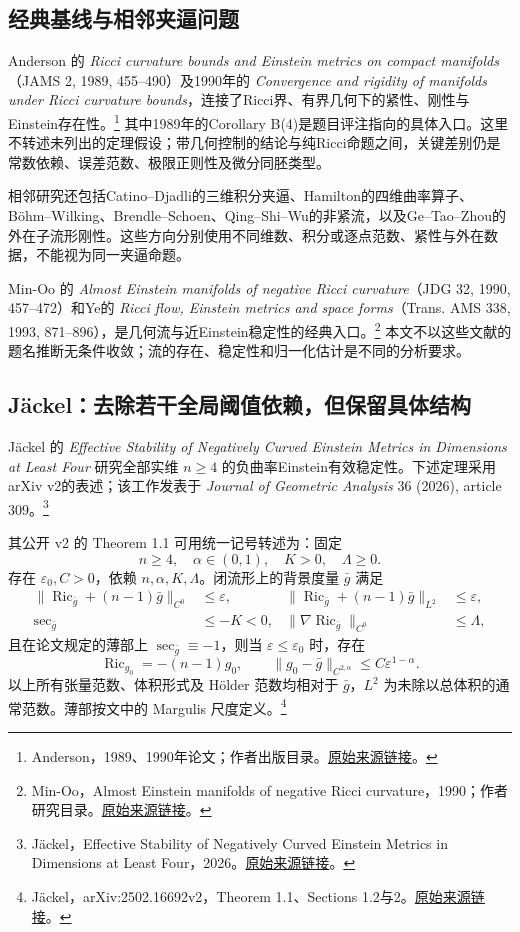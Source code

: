 \documentclass[11pt,a4paper]{article}
\theoremstyle{definition}
\newcommand{\Ric}{\operatorname{Ric}}
\newcommand{\src}[3]{\footnote{\raggedright #1，#2。\href{#3}{原始来源链接}。}}
\begin{document}
\subsection{经典基线与相邻夹逼问题}

Anderson 的 \emph{Ricci curvature bounds and Einstein metrics on compact manifolds}（JAMS 2, 1989, 455--490）及1990年的 \emph{Convergence and rigidity of manifolds under Ricci curvature bounds}，连接了Ricci界、有界几何下的紧性、刚性与Einstein存在性。\src{Anderson}{1989、1990年论文；作者出版目录}{https://www.math.stonybrook.edu/~anderson/publ.pdf}
其中1989年的Corollary B(4)是题目评注指向的具体入口。这里不转述未列出的定理假设；带几何控制的结论与纯Ricci命题之间，关键差别仍是常数依赖、误差范数、极限正则性及微分同胚类型。

相邻研究还包括Catino--Djadli的三维积分夹逼、Hamilton的四维曲率算子、Böhm--Wilking、Brendle--Schoen、Qing--Shi--Wu的非紧流，以及Ge--Tao--Zhou的外在子流形刚性。这些方向分别使用不同维数、积分或逐点范数、紧性与外在数据，不能视为同一夹逼命题。

Min-Oo 的 \emph{Almost Einstein manifolds of negative Ricci curvature}（JDG 32, 1990, 457--472）和Ye的 \emph{Ricci flow, Einstein metrics and space forms}（Trans. AMS 338, 1993, 871--896），是几何流与近Einstein稳定性的经典入口。\src{Min-Oo}{Almost Einstein manifolds of negative Ricci curvature，1990；作者研究目录}{https://math.mcmaster.ca/minoo/research.html}
本文不以这些文献的题名推断无条件收敛；流的存在、稳定性和归一化估计是不同的分析要求。

\subsection{Jäckel：去除若干全局阈值依赖，但保留具体结构}

Jäckel 的 \emph{Effective Stability of Negatively Curved Einstein Metrics in Dimensions at Least Four} 研究全部实维 $n\ge4$ 的负曲率Einstein有效稳定性。下述定理采用arXiv v2的表述；该工作发表于 \emph{Journal of Geometric Analysis} 36 (2026), article 309。\src{Jäckel}{Effective Stability of Negatively Curved Einstein Metrics in Dimensions at Least Four，2026}{https://link.springer.com/article/10.1007/s12220-026-02563-1}

其公开 v2 的 Theorem 1.1 可用统一记号转述为：固定
\[
n\ge4,\quad\alpha\in(0,1),\quad K>0,\quad\Lambda\ge0.
\]
存在 $\varepsilon_0,C>0$，依赖 $n,\alpha,K,\Lambda$。闭流形上的背景度量 $\bar g$ 满足
\begin{align*}
\|\Ric_{\bar g}+(n-1)\bar g\|_{C^0}&\le\varepsilon, &
\|\Ric_{\bar g}+(n-1)\bar g\|_{L^2}&\le\varepsilon,\\
\sec_{\bar g}&\le-K<0, &
\|\nabla\Ric_{\bar g}\|_{C^0}&\le\Lambda,
\end{align*}
且在论文规定的薄部上 $\sec_{\bar g}\equiv-1$，则当 $\varepsilon\le\varepsilon_0$ 时，存在
\[
\Ric_{g_0}=-(n-1)g_0,\qquad
\|g_0-\bar g\|_{C^{2,\alpha}}\le C\varepsilon^{1-\alpha}.
\]
以上所有张量范数、体积形式及 Hölder 范数均相对于 $\bar g$，$L^2$ 为未除以总体积的通常范数。薄部按文中的 Margulis 尺度定义。\src{Jäckel}{arXiv:2502.16692v2，Theorem 1.1、Sections 1.2与2}{https://arxiv.org/html/2502.16692v2}
\end{document}
